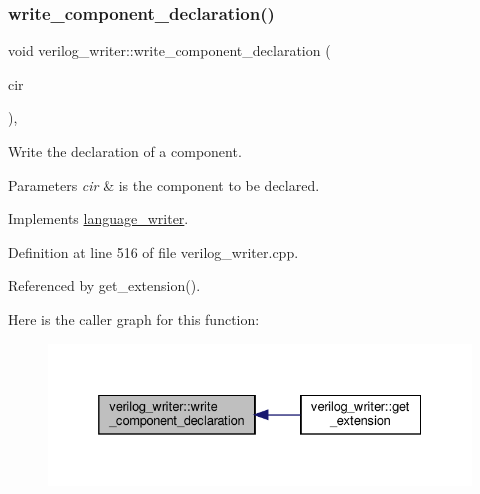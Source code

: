 \subsubsection{\texorpdfstring{write\+\_\+component\+\_\+declaration()}{write\_component\_declaration()}}
{\footnotesize\ttfamily void verilog\+\_\+writer\+::write\+\_\+component\+\_\+declaration (\begin{DoxyParamCaption}\item[{const \hyperlink{structural__objects_8hpp_a8ea5f8cc50ab8f4c31e2751074ff60b2}{structural\+\_\+object\+Ref} \&}]{cir }\end{DoxyParamCaption})\hspace{0.3cm}{\ttfamily [override]}, {\ttfamily [virtual]}}



Write the declaration of a component. 


\begin{DoxyParams}{Parameters}
{\em cir} & is the component to be declared. \\
\hline
\end{DoxyParams}


Implements \hyperlink{classlanguage__writer_a99c30813a77c594298e9d4612d2a7e29}{language\+\_\+writer}.



Definition at line 516 of file verilog\+\_\+writer.\+cpp.



Referenced by get\+\_\+extension().

Here is the caller graph for this function\+:
\nopagebreak
\begin{figure}[H]
\begin{center}
\leavevmode
\includegraphics[width=332pt]{d8/dba/classverilog__writer_a0e4f86c1473978b5c7284b763db4e55a_icgraph}
\end{center}
\end{figure}
\mbox{\label{classverilog__writer_a36a19f7e6beea0b3d1c16389397cf9ea}} 

